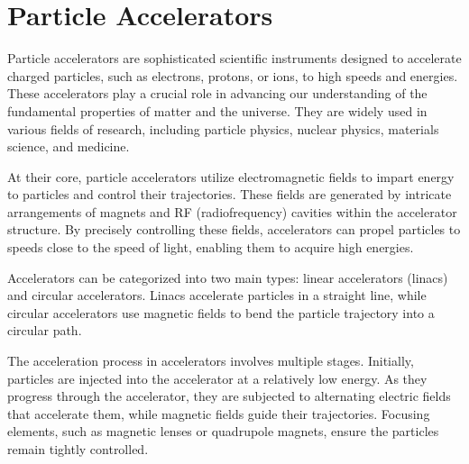 \documentclass{article}
\begin{document}
\newcommand{\vecthreeBF}[1]{\vec{\textbf{#1}}}
\newcommand{\vecthree}[1]{\vec{#1}}

\newcommand{\parDeriv}[2]{\frac{\partial #1}{\partial #2}}
\newcommand{\parDerivS}[2]{\frac{\partial^2 #1}{\partial #2^2}}
\newcommand{\derivS}[2]{\frac{d^2 #1}{d#2^2}}

\newcommand{\dotProdBF}[2]{\vecthreeBF{#1} \cdot \vecthreeBF{#2}}
\newcommand{\dotProd}[2]{\vecthree{#1} \cdot \vecthree{#2}}

\newcommand{\crossProdBF}[2]{\vecthreeBF{#1} \times \vecthreeBF{#2}}
\newcommand{\crossProd}[2]{\vecthree{#1} \times \vecthree{#2}}


\newcommand{\fromeq}[1]{\textit{equation \ref{eq:#1}}}
\newcommand{\fromeqs}[2]{\textit{equations \ref{eq:#1} and \ref{eq:#2}}}

\newcommand{\fromfig}[1]{\textit{figure \ref{fig:#1}}}



\section{Particle Accelerators}

Particle accelerators are sophisticated scientific instruments designed to accelerate charged particles, such as electrons, protons, or ions, to high speeds and energies. 
These accelerators play a crucial role in advancing our understanding of the fundamental properties of matter and the universe. 
They are widely used in various fields of research, including particle physics, nuclear physics, materials science, and medicine.

At their core, particle accelerators utilize electromagnetic fields to impart energy to particles and control their trajectories. 
These fields are generated by intricate arrangements of magnets and RF (radiofrequency) cavities within the accelerator structure. 
By precisely controlling these fields, accelerators can propel particles to speeds close to the speed of light, enabling them to acquire high energies.

Accelerators can be categorized into two main types: linear accelerators (linacs) and circular accelerators. 
Linacs accelerate particles in a straight line, while circular accelerators use magnetic fields to bend the particle trajectory into a circular path. 

The acceleration process in accelerators involves multiple stages. Initially, particles are injected into the accelerator at a relatively low energy. 
As they progress through the accelerator, they are subjected to alternating electric fields that accelerate them, while magnetic fields guide their trajectories.
Focusing elements, such as magnetic lenses or quadrupole magnets, ensure the particles remain tightly controlled.
\end{document}
